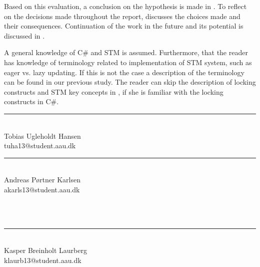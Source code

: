 Based on this evaluation, a conclusion on the hypothesis is made in . To reflect on the decisions made throughout the report,  discusses the choices made and their consequences. Continuation of the work in the future and its potential is discussed in .

A general knowledge of C\# and \ac{STM} is assumed. Furthermore, that the reader has knowledge of terminology related to implementation of \ac{STM} system, such as eager vs. lazy updating. If this is not the case a description of the terminology can be found in our previous study\cite[p. 53]{dpt907e14trending}. The reader can skip the description of locking constructs and \ac{STM} key concepts in , if she is familiar with the locking constructs in C\#.

\newpage
\vspace*{30 mm}
\begin{vplace}

\begin{minipage}[b]{0.45\textwidth}
 \centering
 \rule{\textwidth}{0.5pt}\\
  Tobias Ugleholdt Hansen\\
 {\footnotesize tuha13@student.aau.dk}
\end{minipage}
\begin{minipage}[b]{0.45\textwidth}
 \centering
 \rule{\textwidth}{0.5pt}\\
  Andreas Pørtner Karlsen\\
 {\footnotesize akarls13@student.aau.dk}
\end{minipage}\\\\
\begin{minipage}[b]{0.45\textwidth}
 \centering
 \rule{\textwidth}{0.5pt}\\
  Kasper Breinholt Laurberg\\
 {\footnotesize klaurb13@student.aau.dk}
\end{minipage}\\\\


\end{vplace}
\worksheetend
